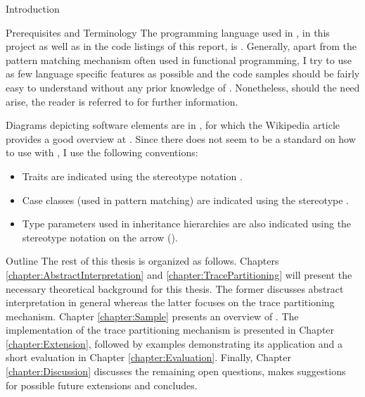 \begin{chapter}{Introduction}
	\begin{section}{Prerequisites and Terminology}
		The programming language used in \sample, in this project as well as in the code listings of this report, is \scala. Generally, apart from the pattern matching mechanism often used in functional programming, I try to use as few language specific features as possible and the code samples should be fairly easy to understand without any prior knowledge of \scala. Nonetheless, should the need arise, the reader is referred to \cite{wiki:scala} for further information.

		Diagrams depicting software elements are in \uml, for which the Wikipedia article provides a good overview at \cite{wiki:uml}. Since there does not seem to be a standard on how to use \uml with \scala, I use the following conventions:

		\begin{itemize}
			\item Traits are indicated using the stereotype notation .
			\item Case classes (used in pattern matching) are indicated using the stereotype .
			\item Type parameters used in inheritance hierarchies are also indicated using the stereotype notation on the arrow ().
		\end{itemize}
	\end{section}

	\begin{section}{Outline}
		The rest of this thesis is organized as follows. Chapters \ref{chapter:AbstractInterpretation} and \ref{chapter:TracePartitioning} will present the necessary theoretical background for this thesis. The former discusses abstract interpretation in general whereas the latter focuses on the trace partitioning mechanism. Chapter \ref{chapter:Sample} presents an overview of \sample. The implementation of the trace partitioning mechanism is presented in Chapter \ref{chapter:Extension}, followed by examples demonstrating its application and a short evaluation in Chapter \ref{chapter:Evaluation}. Finally, Chapter \ref{chapter:Discussion} discusses the remaining open questions, makes suggestions for possible future extensions and concludes.
	\end{section}

\end{chapter}
